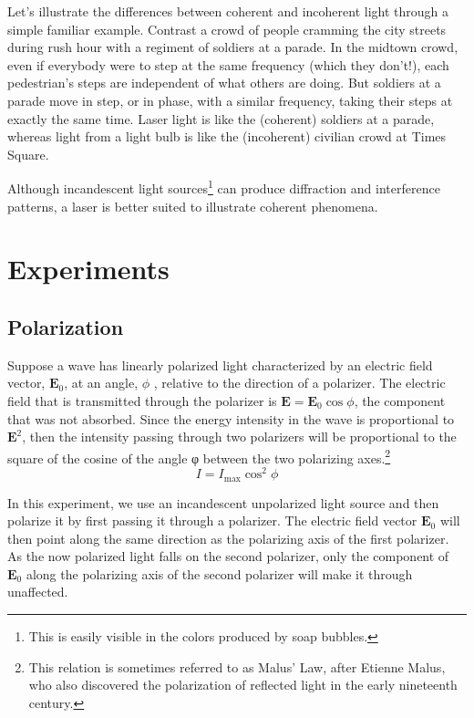  Let's illustrate the differences between coherent and incoherent light through a simple familiar example. Contrast a crowd of people cramming the city streets during rush hour with a regiment of soldiers at a parade. In the midtown crowd, even if everybody were to step at the same frequency (which they don't!), each pedestrian's steps are independent of what others are doing. But soldiers at a parade move in step, or in phase, with a similar frequency, taking their steps at exactly the same time. Laser light is like the (coherent) soldiers at a parade, whereas light from a light bulb is like the (incoherent) civilian crowd at Times Square.\myskip

Although incandescent light sources\footnote{This is easily visible in the colors produced by soap bubbles.} can produce diffraction and interference patterns, a laser is better suited to illustrate coherent phenomena.

\section{Experiments}
\subsection{Polarization}
Suppose a wave has linearly polarized light characterized by an electric field vector, $\mathbf{E}_{0}$, at an angle, $\phi$ , relative to the direction of a polarizer. The electric field that is transmitted through the polarizer is $\mathbf{E}=\mathbf{E}_{0}\cos\phi$, the component that was not absorbed. Since the energy intensity in the wave is proportional to $\mathbf{E}^2$, then the intensity passing through two polarizers will be proportional to the square of the cosine of the angle φ between the two polarizing axes.\footnote{This relation is sometimes referred to as Malus' Law, after Etienne Malus, who also discovered the polarization of reflected light in the early nineteenth century.}
\begin{equation}
  I=I_{\mathrm{max}}\cos^2\phi
\label{eq:i}
\end{equation}

In this experiment, we use an incandescent unpolarized light source and then polarize it by first passing it through a polarizer. The electric field vector $\mathbf{E}_{0}$ will then point along the same direction as the polarizing axis of the first polarizer. As the now polarized light falls on the second polarizer, only the component of $\mathbf{E}_{0}$ along the polarizing axis of the second polarizer will make it through unaffected. \myskip

